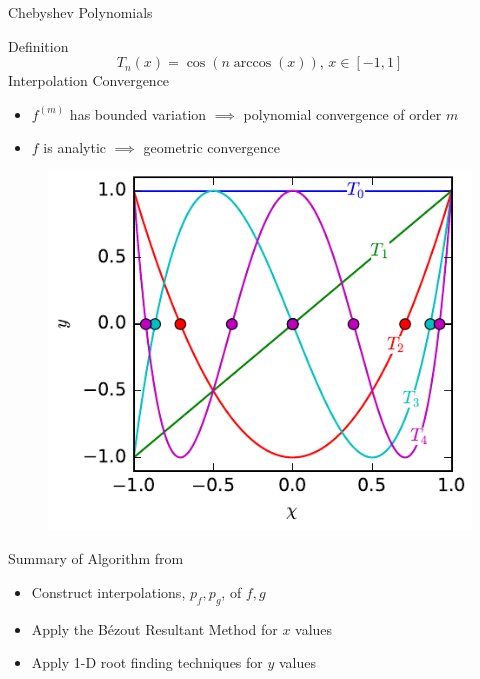 \documentclass[final]{beamer}
\begin{document}
\begin{frame}{}
\begin{columns}[t]
\begin{column}{.31\linewidth}
\begin{block}{Chebyshev Polynomials}
\begin{minipage}{.578\linewidth}
{\color{numhypRed} Definition}
$$T_n(x)=\cos\left(n\arccos(x)\right),\, x\in[-1,1]$$
{\color{numhypRed} Interpolation Convergence \cite[Ch.\ 7, 8]{trefethen_2012}}
\begin{itemize}
\item $f^{(m)}$ has bounded variation $\implies$ polynomial convergence of order $m$
\item $f$ is analytic $\implies$ geometric convergence 
\end{itemize}
\end{minipage}%
\hfill%
\begin{minipage}{.382\linewidth}
\begin{center}
\begin{figure}
\includegraphics[width=\textwidth]{cheb_poly_plot.pdf}
\end{figure}
\end{center}
\end{minipage}%
\end{block}
\begin{block}{Summary of Algorithm from \cite{nakatsukasa_2013}}
\begin{itemize}
\item Construct interpolations, $p_f,p_g$, of $f,g$ \cite[Sec.\ 2]{townsend_2013}
\item Apply the B\'{e}zout Resultant Method for $x$ values
\item Apply 1-D root finding techniques for $y$ values

\end{itemize}
\end{block}
\end{column}
\end{columns}
\end{frame}
\end{document}
